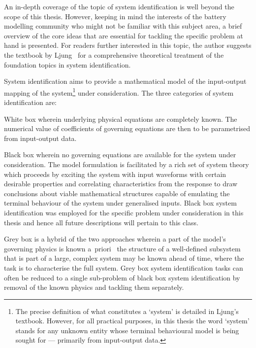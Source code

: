 

An in-depth  coverage of the topic  of system identification is  well beyond the
scope of  this thesis.  However, keeping  in mind the  interests of  the battery
modelling community  who might not be  familiar with this subject  area, a brief
overview of the core ideas that  are essential for tackling the specific problem
at hand is  presented. For readers further interested in  this topic, the author
suggests the textbook by  Ljung~\cite{Ljung1999} for a comprehensive theoretical
treatment of the foundation topics in system identification.

System identification aims  to provide a mathematical model  of the input-output
mapping  of the  system\footnote{The precise  definition of  what constitutes  a
`system' is detailed  in Ljung's textbook. However, for  all practical purposes,
in this  thesis the word `system'  stands for any unknown  entity whose terminal
behavioural model  is being  sought for ---  primarily from  input-output data.}
under consideration. The three categories of system identification are:


\begin{enumdescriptnum}[leftmargin=!,itemsep=1ex,labelwidth=\widthof{$\symbf{\text{brugg}_j}\ \scriptstyle (\times 3)$abc}
    ,partopsep=0pt
    ,topsep=0pt
    ]

\item[White  box] wherein  underlying physical  equations are  completely known.
The  numerical value  of  coefficients of  governing equations  are  then to  be
parametrised from input-output data.

\item[Black box]  wherein no  governing equations are  available for  the system
under  consideration. The  model formulation  is facilitated  by a  rich set  of
system theory  which proceeds by exciting  the system with input  waveforms with
certain desirable  properties and correlating characteristics  from the response
to draw  conclusions about viable  mathematical structures capable  of emulating
the terminal behaviour of the system  under generalised inputs. Black box system
identification was employed for the specific problem under consideration in this
thesis and hence all future descriptions will pertain to this class.

\item[Grey box] is a hybrid of the  two approaches wherein a part of the model's
governing  physics is  known  a~priori  \eg~the  structure  of a  well-defined
subsystem  that is  part  of a  large,  complex  system may  be  known ahead  of
time,  where the  task  is  to characterise  the  full  system. Grey box  system
identification tasks can  often be reduced to a single  sub-problem of black box
system  identification  by  removal  of  the known  physics  and  tackling  them
separately.

\end{enumdescriptnum}

